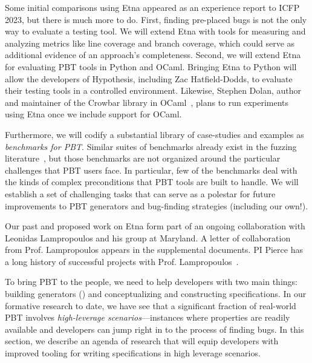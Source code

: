 Some initial comparisons using Etna appeared as an experience report to ICFP
2023, but there is much more to do. First, finding pre-placed bugs is not the
only way to evaluate a testing tool. We will extend Etna with
tools for measuring and analyzing metrics like line coverage and branch
coverage, which could serve as additional evidence of an approach's
completeness. Second, we will extend Etna for evaluating PBT
tools in Python and OCaml. Bringing Etna to Python will
allow the developers of Hypothesis, including Zac Hatfield-Dodds, to evaluate their testing tools in a controlled
environment. Likewise, Stephen Dolan, author and maintainer of
the Crowbar library in OCaml~\cite{dolan2017testing}, plans to run experiments using Etna once
we include support for OCaml.

Furthermore, we will codify a substantial library of case-studies and examples as
{\em benchmarks for PBT}. Similar suites of benchmarks already exist in the
fuzzing literature~\cite{hazimeh_magma_2021}, but those benchmarks are not
organized around the particular challenges that PBT users face. In particular,
few of the benchmarks deal with the kinds of complex preconditions that PBT
tools are built to handle. We will establish a set of challenging tasks that
can serve as a polestar for future improvements to PBT generators and
bug-finding strategies (including our own!).

Our past and proposed work on Etna form part of an ongoing
collaboration with Leonidas Lampropoulos and his group at Maryland.
A letter of collaboration
from Prof.{} Lampropoulos appears in the supplemental documents.
PI Pierce has a long history
of successful projects with Prof.
Lampropoulos~\cite[etc.]{beginners-luck,DBLP:conf/esop/GoldsteinHLP21,lampropoulos_coverage_2019,Lampropoulos&18,OLDlampropoulos19fuzzchick}.


%
To bring PBT to the people, we need to help developers with two main
things: building generators () and conceptualizing and constructing
specifications.
%
In our formative research to date, we have
see that a significant fraction of real-world PBT
involves {\em high-leverage scenarios}---instances where properties are
readily available and developers can jump right in to the process of finding
bugs.
%
In this section, we describe an agenda of research that will equip developers
with improved tooling for writing
specifications in high leverage scenarios.

